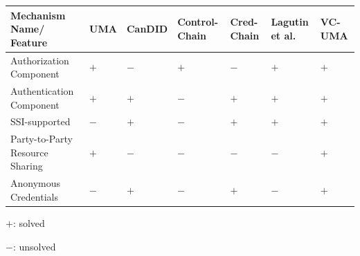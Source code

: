 \documentclass[conference, dvipdfmx]{IEEEtran} %
\begin{document}
\begin{sloppypar}
\begin{table}[htbp]
\begin{center}
  \begin{threeparttable} %
    \begin{tabular}{p{1.5cm} >{\centering\arraybackslash}p{0.4cm} >{\centering\arraybackslash}p{0.6cm} >{\centering\arraybackslash}p{0.8cm} >{\centering\arraybackslash}p{0.8cm} >{\centering\arraybackslash}p{0.8cm} >{\centering\arraybackslash}p{0.8cm}}
    \hline
    Mechanism Name/ Feature & UMA & CanDID \cite{CanDID} & Control-Chain \cite{Controlchain}
    & Cred-Chain \cite{Selective_Disclosure_paper} & Lagutin et al. \cite{VC_Oauth} 	& VC-UMA \\ \hline\hline
    Authorization Component & $+$ & $-$ & $+$ & $-$ & $+$ & $+$ \\ \hline
    Authentication Component & $+$ & $+$ & $-$ & $+$ & $+$ & $+$ \\ \hline
    SSI-supported  & $-$ & $+$ &  $-$ & $+$ & $+$ & $+$ \\ \hline
    Party-to-Party Resource Sharing & $+$ &  $-$  & $-$ & $-$ & $-$ & $+$ \\ \hline
    Anonymous Credentials & $-$ & $+$  & $-$ & $+$  & $-$  & $+$ \\ \hline
    \end{tabular}
    \begin{tablenotes} %
      \item $+$: solved%
      \item $-$: unsolved%
      \end{tablenotes} %
  \end{threeparttable} %
  \end{center}

\end{table}


\end{sloppypar}
\end{document}
